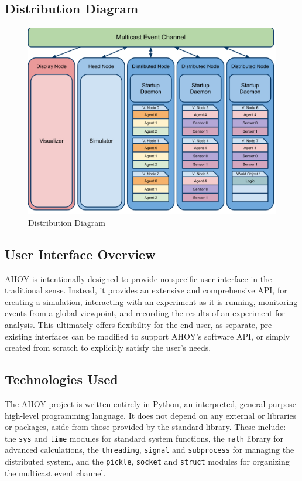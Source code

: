 \documentclass[titlepage]{article}
\begin{document}
\subsection{Distribution Diagram}
\begin{figure}%
    \centering
    \includegraphics[scale=.6]{../initial-pres/arch.pdf}
    \caption{Distribution Diagram}
    \label{fig:distribution}
\end{figure}

\subsection{User Interface Overview}
\label{sec:user_interface}
AHOY is intentionally designed to provide no specific user interface in the traditional sense. Instead, it provides an extensive and comprehensive API, for creating a simulation, interacting with an experiment as it is running, monitoring events from a global viewpoint, and recording the results of an experiment for analysis. This ultimately offers flexibility for the end user, as separate, pre-existing interfaces can be modified to support AHOY's software API, or simply created from scratch to explicitly satisfy the user's needs. 

\subsection{Technologies Used}
The AHOY project is written entirely in Python, an interpreted, general-purpose high-level programming language. It does not depend on any external or libraries or packages, aside from those provided by the standard library. These include: the \texttt{sys} and \texttt{time} modules for standard system functions, the \texttt{math} library for advanced calculations, the \texttt{threading}, \texttt{signal} and \texttt{subprocess} for managing the distributed system, and the \texttt{pickle}, \texttt{socket} and \texttt{struct} modules for organizing the multicast event channel.
\end{document}
